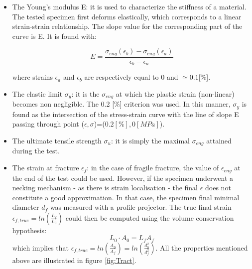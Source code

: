 \begin{itemize}

\item The Young's modulus E: it is used to characterize the stiffness of a material. The tested specimen first deforms elastically, which corresponds to a linear strain-strain relationship. The slope value for the corresponding part of the curve is  E. It is found with:

$$E=\frac{\sigma_{eng}(\epsilon_b)-\sigma_{eng}(\epsilon_a)}{\epsilon_b-\epsilon_a}$$

where strains $\epsilon_a$ and $\epsilon_b$ are respectively equal to 0 and $\simeq 0.1$[\%].

\item The elastic limit $\sigma_y$: it is the $\sigma_{eng}$ at which the plastic strain (non-linear) becomes non negligible. The 0.2 [\%] criterion was used. In this manner, $\sigma_y$ is found as the intersection of the stress-strain curve with the line of slope E passing through point ($\epsilon,\sigma$)=($0.2 [\%],0 [MPa]$).

\item The ultimate tensile strength $\sigma_u$: it is simply the maximal $\sigma_{eng}$ attained during the test.

\item The strain at fracture $\epsilon_{f}$: in the case of fragile fracture, the value of $\epsilon_{eng}$ at the end of the test could be used. However, if the specimen underwent a necking mechanism -  as there is strain localisation - the final $\epsilon$ does not constitute a good approximation. In that case, the specimen final minimal diameter $d_f$ was measured with a profile projector. The true final strain $\epsilon_{f,true}=ln(\frac{L_f}{L_0})$ could then be computed using the volume conservation hypothesis: $$L_0 \cdot A_0 = L_f A_f $$
which implies that $\epsilon_{f,true}=ln(\frac{A_0}{A_f})=ln(\frac{d_0^2}{d_f^2})$. All the properties mentioned above are illustrated in figure \ref{fig:Tract}.


\end{itemize}

